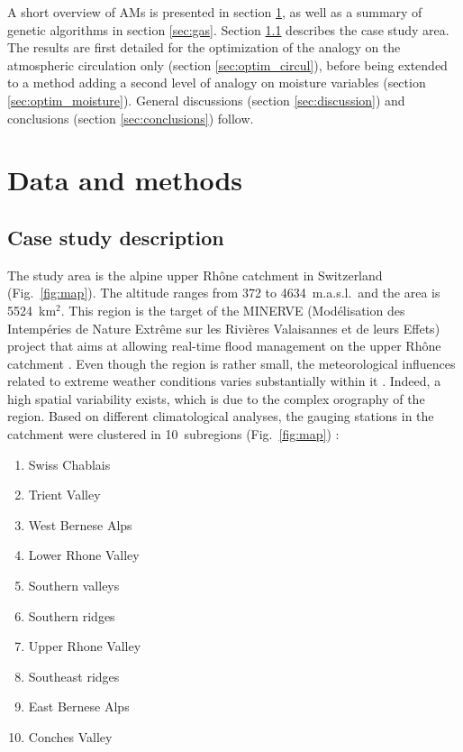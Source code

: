 \documentclass[review]{elsarticle}
\begin{document}
A short overview of AMs is presented in section \ref{sec:data_methods}, as well as a summary of genetic algorithms in section \ref{sec:gas}. Section \ref{sec:case_study} describes the case study area. The results are first detailed for the optimization of the analogy on the atmospheric circulation only (section \ref{sec:optim_circul}), before being extended to a method adding a second level of analogy on moisture variables (section \ref{sec:optim_moisture}). General discussions (section \ref{sec:discussion}) and conclusions (section \ref{sec:conclusions}) follow.


\section{Data and methods}
\label{sec:data_methods}


\subsection{Case study description}
\label{sec:case_study}

The study area is the alpine upper Rh\^{o}ne catchment in Switzerland (Fig.\ \ref{fig:map}). The altitude ranges from 372 to 4634~m.a.s.l.\ and the area is 5524~km$^{2}$. This region is the target of the MINERVE (Mod\'{e}lisation des Intemp\'{e}ries de Nature Extr\^{e}me sur les Rivi\`{e}res Valaisannes et de leurs Effets) project that aims at allowing real-time flood management on the upper Rh\^{o}ne catchment \citep{GarciaHernandez2009b}. Even though the region is rather small, the meteorological influences related to extreme weather conditions varies substantially within it \citep[see][]{Horton2012}. Indeed, a high spatial variability exists, which is due to the complex orography of the region. Based on different climatological analyses, the gauging stations in the catchment were clustered in 10~subregions (Fig.\ \ref{fig:map}) :

\begin{enumerate}
	\item Swiss Chablais
	\item Trient Valley
	\item West Bernese Alps
	\item Lower Rhone Valley
	\item Southern valleys
	\item Southern ridges
	\item Upper Rhone Valley
	\item Southeast ridges
	\item East Bernese Alps
	\item Conches Valley
\end{enumerate}
\end{document}
